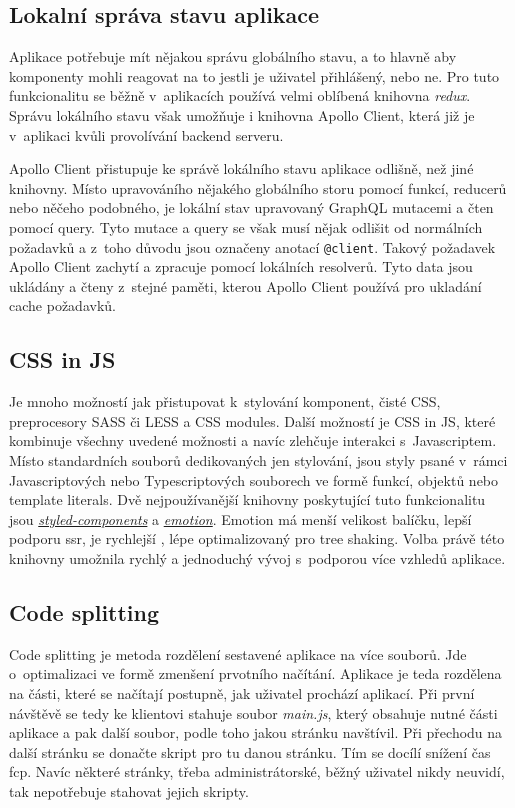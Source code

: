 \subsection{Lokalní správa stavu aplikace}
\label{ss:local_state_management}
Aplikace potřebuje mít nějakou správu globálního stavu, a to hlavně aby komponenty mohli reagovat na to jestli je uživatel přihlášený, nebo ne. Pro tuto funkcionalitu se běžně v~aplikacích používá velmi oblíbená knihovna \emph{redux}. Správu lokálního stavu však umožňuje i knihovna Apollo Client, která již je v~aplikaci kvůli provolívání backend serveru.

Apollo Client přistupuje ke správě lokálního stavu aplikace odlišně, než jiné knihovny. Místo upravováního nějakého globálního storu pomocí funkcí, reducerů nebo něčeho podobného, je lokální stav upravovaný GraphQL mutacemi a čten pomocí query. Tyto mutace a query se však musí nějak odlišit od normálních požadavků a z~toho důvodu jsou označeny anotací \texttt{@client}. Takový požadavek Apollo Client zachytí a zpracuje pomocí lokálních resolverů. Tyto data jsou ukládány a čteny z~stejné paměti, kterou Apollo Client používá pro ukladání cache požadavků.

\subsection{CSS in JS}
\label{ss:css_in_js}
Je mnoho možností jak přistupovat k~stylování komponent, čisté CSS, preprocesory SASS či LESS a CSS modules. Další možností je CSS in JS, které kombinuje všechny uvedené možnosti a navíc zlehčuje interakci s~Javascriptem. Místo standardních souborů dedikovaných jen stylování, jsou styly psané v~rámci Javascriptových nebo Typescriptových souborech ve formě funkcí, objektů nebo template literals. Dvě nejpoužívanější knihovny poskytující tuto funkcionalitu jsou \href{https://styled-components.com/}{\emph{styled-components}} a \href{https://emotion.sh/}{\emph{emotion}}. Emotion má menší velikost balíčku, lepší podporu \acrshort{ssr}, je rychlejší \cite{shehet_2020_css}, lépe optimalizovaný pro \gls{tree shaking}. Volba právě této knihovny umožnila rychlý a jednoduchý vývoj s~podporou více vzhledů aplikace.

\subsection{Code splitting}
\label{ss:code_splitting}
Code splitting je metoda rozdělení sestavené aplikace na více souborů. Jde o~optimalizaci ve formě zmenšení prvotního načítání. Aplikace je teda rozdělena na části, které se načítají postupně, jak uživatel prochází aplikací. Při první návštěvě se tedy ke klientovi stahuje soubor \emph{main.js}, který obsahuje nutné části aplikace a pak další soubor, podle toho jakou stránku navštívil. Při přechodu na další stránku se donačte skript pro tu danou stránku. Tím se docílí snížení čas \acrshort{fcp}. Navíc některé stránky, třeba administrátorské, běžný uživatel nikdy neuvidí, tak nepotřebuje stahovat jejich skripty.

